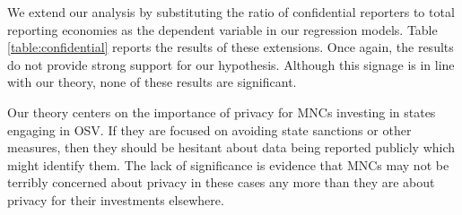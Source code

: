 \documentclass[11pt, titlepage]{article} %
\begin{document}
We extend our analysis by substituting the ratio of confidential reporters to total reporting economies as the dependent variable in our regression models. Table \ref{table:confidential} reports the results of these extensions. Once again, the results do not provide strong support for our hypothesis. Although this signage is in line with our theory, none of these results are significant. 

Our theory centers on the importance of privacy for MNCs investing in states engaging in OSV. If they are focused on avoiding state sanctions or other measures, then they should be hesitant about data being reported publicly which might identify them. The lack of significance is evidence that MNCs may not be terribly concerned about privacy in these cases any more than they are about privacy for their investments elsewhere. 
\end{document}
